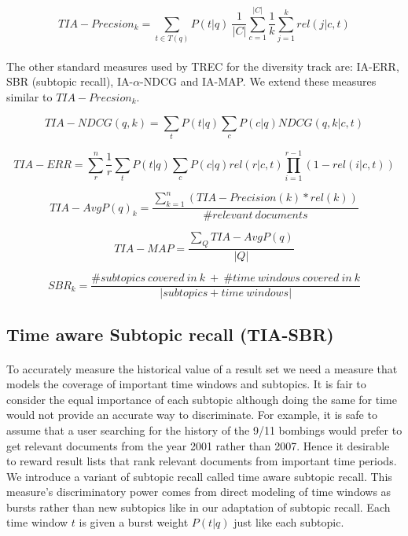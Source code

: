 \begin{equation}
TIA-Precsion_k= \sum_{t \in T(q)} P(t|q) \: \frac{1}{|C|}\sum_{c=1}^{|C|}\frac{1}{k}\sum_{j=1}^{k}rel(j|c,t)
\end{equation}

\paragraph{}
The other standard measures used by TREC for the diversity track are: IA-ERR, SBR (subtopic recall), IA-$\alpha$-NDCG and IA-MAP. We extend these measures similar to $TIA-Precsion_k$.

\begin{equation}
TIA-NDCG(q,k) = \sum_{t} P(t|q) \sum_{c} P(c|q) NDCG(q,k|c,t)
\end{equation}

\begin{equation}
TIA-ERR = \sum_{r}^{n} \frac{1}{r} \sum_{t} P(t|q) \sum_{c} P(c|q) rel(r|c,t) \prod_{i=1}^{r-1} (1-rel(i|c,t))
\end{equation}

\begin{equation}
TIA-AvgP(q)_k = \frac{\sum_{k=1}^{n} (TIA-Precision(k) * rel(k))}{\# relevant\:documents} 
\end{equation}

\begin{equation}
TIA-MAP = \frac{\sum_Q TIA-AvgP(q) }{|Q|}
\end{equation}

\begin{equation}
SBR_k = \frac{\# subtopics \: covered \: in \: k\:  +\:  \# time \: windows \: covered \: in \: k }{|subtopics+time\:windows|}
\end{equation}


\subsection{Time aware Subtopic recall (TIA-SBR)}

\paragraph{}
To accurately measure the historical value of a result set we need a measure that models the coverage of important time windows and subtopics. It is fair to consider the equal importance of each subtopic although doing the same for time would not provide an accurate way to discriminate. For example, it is safe to assume that a user searching for the history of the 9/11 bombings would prefer to get relevant documents from the year 2001 rather than 2007. Hence it desirable to reward result lists that rank relevant documents from important time periods. We introduce a variant of subtopic recall called time aware subtopic recall. This measure's discriminatory power comes from direct modeling of time windows as bursts rather than new subtopics like in our adaptation of subtopic recall. Each time window $t$ is given a burst weight $P(t|q)$ just like each subtopic.

